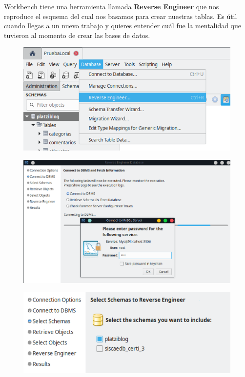 \documentclass{article}
\begin{document}
\newpage
Workbench tiene una herramienta llamada \textbf{Reverse Engineer} que nos
reproduce el esquema del cual nos basamos para crear nuestras tablas. Es útil
cuando llegas a un nuevo trabajo y quieres entender cuál fue la mentalidad que
tuvieron al momento de crear las bases de datos.

\begin{figure}[h!]
  \centering
  \includegraphics[scale=0.55]{./Pictures/076_reverse_engineer.png}
\end{figure}

\begin{figure}[h!]
  \centering
  \includegraphics[scale=0.55]{./Pictures/077_reverse_engineer.png}
\end{figure}

\begin{figure}[h!]
  \centering
  \includegraphics[scale=0.55]{./Pictures/077_select_schema.png}
\end{figure}
\end{document}
